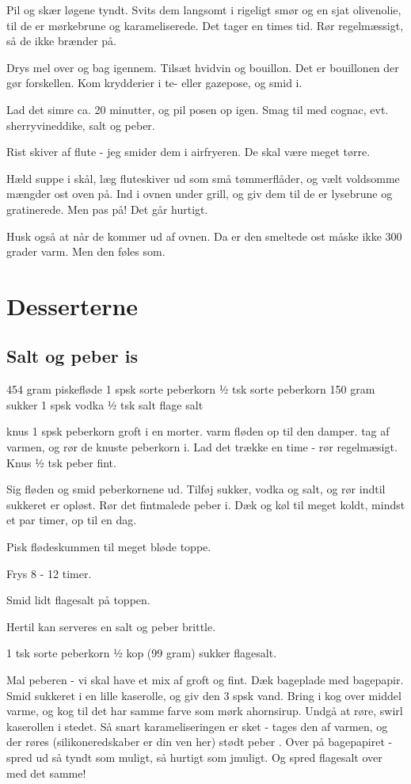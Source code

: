 \documentclass[
]{book}
\begin{document}
Pil og skær løgene tyndt. Svits dem langsomt i rigeligt smør og
en sjat olivenolie, til de er mørkebrune og karameliserede. Det tager
en times tid. Rør regelmæssigt, så de ikke brænder på.

Drys mel over og bag igennem. Tilsæt hvidvin og bouillon. Det er bouillonen
der gør forskellen. Kom krydderier i te- eller gazepose, og smid i.

Lad det simre ca. 20 minutter, og pil posen op igen. Smag til med
cognac, evt. sherryvineddike, salt og peber.

Rist skiver af flute - jeg smider dem i airfryeren. De skal være meget
tørre.

Hæld suppe i skål, læg fluteskiver ud som små tømmerflåder, og vælt
voldsomme mængder ost oven på. Ind i ovnen under grill, og giv dem til
de er lysebrune og gratinerede. Men pas på! Det går hurtigt.

Husk også at når de kommer ud af ovnen. Da er den smeltede ost måske ikke
300 grader varm. Men den føles som.

\chapter{Desserterne}\label{desserterne}

\section{Salt og peber is}\label{salt-og-peber-is}

454 gram piskefløde
1 spsk sorte peberkorn
½ tsk sorte peberkorn
150 gram sukker
1 spsk vodka
½ tsk salt
flage salt

knus 1 spsk peberkorn groft i en morter.
varm fløden op til den damper. tag af varmen, og rør de
knuste peberkorn i. Lad det trække en time - rør regelmæsigt.
Knus ½ tsk peber fint.

Sig fløden og smid peberkornene ud. Tilføj sukker,
vodka og salt, og rør indtil sukkeret er opløst.
Rør det fintmalede peber i. Dæk og køl til meget
koldt, mindst et par timer, op til en dag.

Pisk flødeskummen til meget bløde toppe.

Frys 8 - 12 timer.

Smid lidt flagesalt på toppen.

Hertil kan serveres en salt og peber brittle.

1 tsk sorte peberkorn
½ kop (99 gram) sukker
flagesalt.

Mal peberen - vi skal have et mix af groft og fint.
Dæk bageplade med bagepapir.
Smid sukkeret i en lille kaserolle, og giv den 3
spsk vand. Bring i kog over middel varme,
og kog til det har samme farve som mørk ahornsirup.
Undgå at røre, swirl kaserollen i stedet.
Så snart karameliseringen er sket - tages den af varmen, og der røres (silikoneredskaber er din ven her) stødt peber . Over på bagepapiret - spred ud så tyndt som muligt, så hurtigt som jmuligt. Og spred
flagesalt over med det samme!
\end{document}
